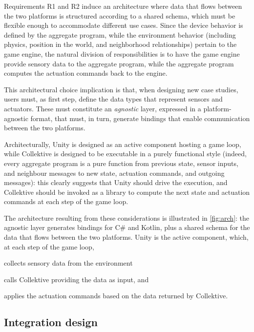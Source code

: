 Requirements R1 and R2 induce an architecture where data that flows between the two platforms
is structured according to a shared schema, which must be flexible enough to accommodate different use cases.
%
Since the device behavior is defined by the aggregate program,
while the environment behavior
(including physics, position in the world, and neighborhood relationships)
pertain to the game engine,
the natural division of responsibilities is to have the game engine provide sensory data to the aggregate program,
while the aggregate program computes the actuation commands back to the engine.

This architectural choice implication is that, when designing new case studies,
users must, as first step,
define the data types that represent sensors and actuators.
%
These must constitute an \emph{agnostic} layer,
expressed in a platform-agnostic format,
that must, in turn, generate bindings that enable communication between the two platforms.

Architecturally,
Unity is designed as an active component hosting a game loop,
while Collektive is designed to be executable in a purely functional style
(indeed, every aggregate program is a pure function from previous state, sensor inputs,
and neighbour messages to new state, actuation commands, and outgoing messages):
this clearly suggests that Unity should drive the execution,
and Collektive should be invoked as a library to compute the next state and actuation commands at each step of the game loop.

The architecture resulting from these considerations is illustrated in \cref{fig:arch}:
the agnostic layer generates bindings for C\# and Kotlin,
plus a shared schema for the data that flows between the two platforms.
%
Unity is the active component,
which, at each step of the game loop,
\begin{inlinelist}
    \item collects sensory data from the environment
    \item calls Collektive providing the data as input, and
    \item applies the actuation commands based on the data returned by Collektive.
\end{inlinelist}

\subsection{Integration design}\label{subsec:integration-design}

